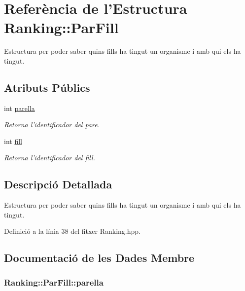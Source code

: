 \hypertarget{struct_ranking_1_1_par_fill}{\section{Referència de l'Estructura Ranking\-:\-:Par\-Fill}
\label{struct_ranking_1_1_par_fill}
}


Estructura per poder saber quins fills ha tingut un organisme i amb qui els ha tingut.  


\subsection*{Atributs Públics}
\begin{DoxyCompactItemize}
\item 
int \hyperlink{struct_ranking_1_1_par_fill_a73b7b596d987abbf7f27026317b5a85c}{parella}
\begin{DoxyCompactList}\small\item\em Retorna l'identificador del pare. \end{DoxyCompactList}\item 
int \hyperlink{struct_ranking_1_1_par_fill_a3b20e448cd957e593268c84368529b05}{fill}
\begin{DoxyCompactList}\small\item\em Retorna l'identificador del fill. \end{DoxyCompactList}\end{DoxyCompactItemize}


\subsection{Descripció Detallada}
Estructura per poder saber quins fills ha tingut un organisme i amb qui els ha tingut. 

Definició a la línia 38 del fitxer Ranking.\-hpp.



\subsection{Documentació de les Dades Membre}
\hypertarget{struct_ranking_1_1_par_fill_a73b7b596d987abbf7f27026317b5a85c}{
\subsubsection[{parella}]{\setlength{\rightskip}{0pt plus 5cm}Ranking\-::\-Par\-Fill\-::parella}}\label{struct_ranking_1_1_par_fill_a73b7b596d987abbf7f27026317b5a85c}


